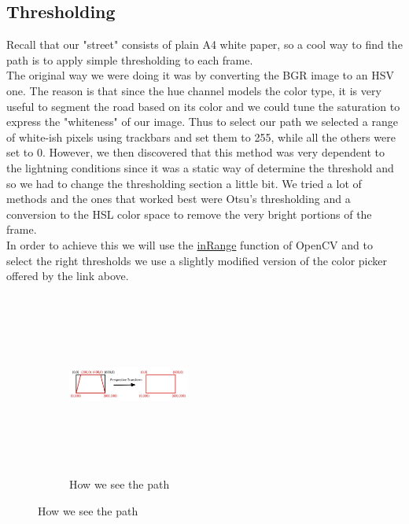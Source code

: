 \documentclass[12pt,a4paper]{article}
\begin{document}
\begin{large}
\subsection{Thresholding}
Recall that our "street" consists of plain A4 white paper, so a cool way to find the path is to apply simple thresholding to each frame.\\
The original way we were doing it was by converting the BGR image to an HSV one. The reason is that since the hue channel models the color type, it is very useful to segment the road based on its color and we could tune the saturation to express the "whiteness" of our image. Thus to select our path we selected a range of white-ish pixels using trackbars and set them to 255, while all the others were set to 0. However, we then discovered that this method was very dependent to the lightning conditions since it was a static way of determine the threshold and so we had to change the thresholding section a little bit. We tried a lot of methods and the ones that worked best were Otsu's thresholding and a conversion to the HSL color space to remove the very bright portions of the frame.\\
In order to achieve this we will use the \href{https://docs.opencv.org/3.4/da/d97/tutorial_threshold_inRange.html}{inRange} function of OpenCV and to select the right thresholds we use a slightly modified version of the color picker offered by the link above.

\begin{figure} [!htb]
  \centering
    \begin{subfigure}[b]{0.4\textwidth}
    \centering
    \captionsetup{justification=centering}
      \includegraphics[width=4cm, height = 6cm]{images/perspective_transform.jpg}
      \caption{How we see the path}
      

\end{subfigure}
\end{figure}
\end{large}
\end{document}
